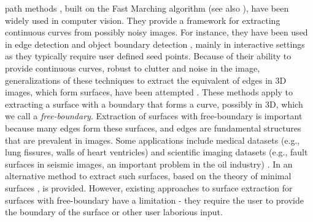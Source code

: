 \documentclass[10pt,journal,compsoc]{IEEEtran}
\begin{document}
%
\IEEEpeerreviewmaketitle




 path methods \cite{cohen1997global}, built on
the Fast Marching algorithm \cite{sethian1996fast} (see also
\cite{tsitsiklis1995efficient}), have been widely used in computer
vision. They provide a framework for extracting continuous curves from
possibly noisy images. For instance, they have been used in edge
detection \cite{kaul2012detecting} and object boundary detection
\cite{mille2015combination}, mainly in interactive settings as they
typically require user defined seed points. Because of their ability
to provide continuous curves, robust to clutter and noise in the
image, generalizations of these techniques to extract the equivalent
of edges in 3D images, which form surfaces, have been attempted
\cite{benmansour2009single,ardon2005new}.  These methods apply to
extracting a surface with a boundary that forms a curve, possibly in
3D, which we call a \emph{free-boundary}. Extraction of surfaces with
free-boundary is important because many edges form these surfaces, and
edges are fundamental structures that are prevalent in images. Some
applications include medical datasets (e.g., lung fissures, walls of
heart ventricles) \cite{grady2010minimal} and scientific imaging
datasets (e.g., fault surfaces in seismic images, an important problem
in the oil industry) \cite{hale2013methods}. In
\cite{grady2010minimal} an alternative method to extract such
surfaces, based on the theory of minimal surfaces
\cite{sullivan1990crystalline}, is provided. However, existing
approaches to surface extraction for surfaces with free-boundary have
a limitation - they require the user to provide the boundary of the
surface or other user laborious input.
\end{document}
